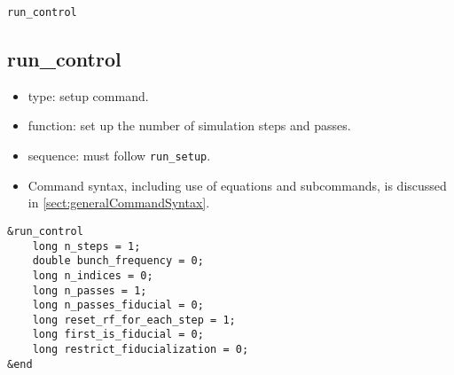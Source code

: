 \documentclass[11pt]{article}
\begin{document}
\newpage
\begin{center}{\Large\verb|run_control|}\end{center}
\subsection{run\_control \label{subsec:runcontrol}}

\begin{itemize}
\item type: setup command.
\item function: set up the number of simulation steps and passes.
\item sequence: must follow \verb|run_setup|.
\item Command syntax, including use of equations and subcommands, is discussed in \ref{sect:generalCommandSyntax}.
\end{itemize}

\begin{verbatim}
&run_control
    long n_steps = 1;
    double bunch_frequency = 0;
    long n_indices = 0;
    long n_passes = 1;
    long n_passes_fiducial = 0;
    long reset_rf_for_each_step = 1;
    long first_is_fiducial = 0;
    long restrict_fiducialization = 0;
&end
\end{verbatim}
\end{document}
